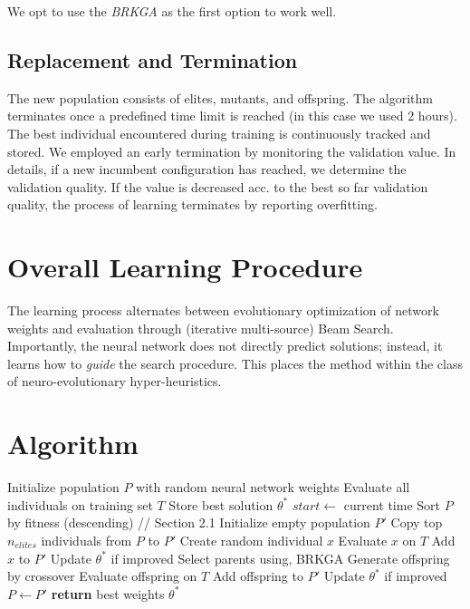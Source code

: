 \documentclass[11pt,a4paper]{article}
\begin{document}
We opt to use the \textit{BRKGA} as the first option to work well. 


\subsection{Replacement and Termination}

The new population consists of elites, mutants, and offspring. The algorithm terminates once a predefined time limit is reached (in this case we used 2 hours). The best individual encountered during training is continuously tracked and stored. We employed an early termination by monitoring the validation value. In details, if a new  incumbent configuration has reached, we determine the validation quality. If the value is decreased acc. to the best so far validation quality, the process of learning terminates by reporting overfitting. 

\section{Overall Learning Procedure}

The learning process alternates between evolutionary optimization of network weights and evaluation through (iterative multi-source) Beam Search. Importantly, the neural network does not directly predict solutions; instead, it learns how to \textit{guide} the search procedure. This places the method within the class of neuro-evolutionary hyper-heuristics.

\section{Algorithm}

\begin{algorithm}[H]
\caption{GA-Based Learning of a Beam Search Heuristic (BRKGA)}
\begin{algorithmic}[1]
\STATE Initialize population $P$ with random neural network weights
\STATE Evaluate all individuals on training set $T$
\STATE Store best solution $\theta^\ast$
\STATE $start \leftarrow$ current time
    \STATE Sort $P$ by fitness (descending) // {Section 2.1}
    \STATE Initialize empty population $P'$
    \STATE Copy top $n_{elites}$ individuals from $P$ to $P'$
        \STATE Create random individual $x$
        \STATE Evaluate $x$ on $T$
        \STATE Add $x$ to $P'$
        \STATE Update $\theta^\ast$ if improved
    \ENDFOR
        \STATE Select parents using, BRKGA
        \STATE Generate offspring by crossover
        \STATE Evaluate offspring on $T$
        \STATE Add offspring to $P'$
        \STATE Update $\theta^\ast$ if improved
    \ENDFOR
    \STATE $P \leftarrow P'$
\ENDWHILE
\STATE \textbf{return} best weights $\theta^\ast$
\end{algorithmic}
\end{algorithm}
\end{document}
